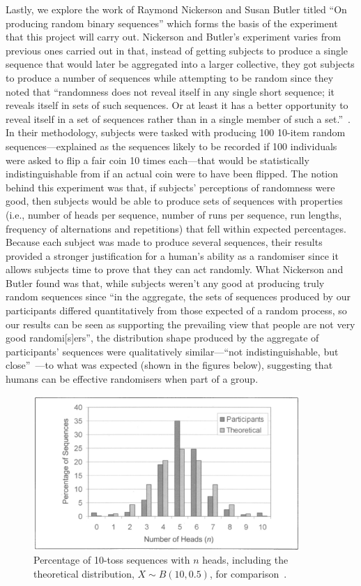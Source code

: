 Lastly, we explore the work of Raymond Nickerson and Susan Butler titled ``On producing random binary sequences'' which forms the basis of the experiment that this project will carry out. Nickerson and Butler's experiment varies from previous ones carried out in that, instead of getting subjects to produce a single sequence that would later be aggregated into a larger collective, they got subjects to produce a number of sequences while attempting to be random since they noted that ``randomness does not reveal itself in any single short sequence; it reveals itself in sets of such sequences. Or at least it has a better opportunity to reveal itself in a set of sequences rather than in a single member of such a set.''~\cite{nickerson:2009}. In their methodology, subjects were tasked with producing 100 10-item random sequences—explained as the sequences likely to be recorded if 100 individuals were asked to flip a fair coin 10 times each—that would be statistically indistinguishable from if an actual coin were to have been flipped. The notion behind this experiment was that, if subjects' perceptions of randomness were good, then subjects would be able to produce sets of sequences with properties (i.e., number of heads per sequence, number of runs per sequence, run lengths, frequency of alternations and repetitions) that fell within expected percentages. Because each subject was made to produce several sequences, their results provided a stronger justification for a human's ability as a randomiser since it allows subjects time to prove that they can act randomly. What Nickerson and Butler found was that, while subjects weren't any good at producing truly random sequences since ``in the aggregate, the sets of sequences produced by our participants differed quantitatively from those expected of a random process, so our results can be seen as supporting the prevailing view that people are not very good randomi[s]ers'', the distribution shape produced by the aggregate of participants' sequences were qualitatively similar—``not indistinguishable, but close''~\cite{nickerson:2009}—to what was expected (shown in the figures below), suggesting that humans can be effective randomisers when part of a group.
\begin{figure}
    \centering
    \includegraphics[width=0.9\textwidth]{images/nickerson_2009_number_of_heads.png}
    \caption{Percentage of 10-toss sequences with $n$ heads, including the theoretical distribution, $X \sim B(10, 0.5)$, for comparison~\cite{nickerson:2009}.}
\end{figure}

